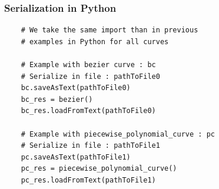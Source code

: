 \documentclass{article}
\begin{document}
    \subsubsection{Serialization in Python}
    \begin{lstlisting}
    # We take the same import than in previous
    # examples in Python for all curves
    
    # Example with bezier curve : bc
    # Serialize in file : pathToFile0
    bc.saveAsText(pathToFile0)
    bc_res = bezier()
    bc_res.loadFromText(pathToFile0)
    
    # Example with piecewise_polynomial_curve : pc
    # Serialize in file : pathToFile1
    pc.saveAsText(pathToFile1)
    pc_res = piecewise_polynomial_curve()
    pc_res.loadFromText(pathToFile1)
    \end{lstlisting}
    
\end{document}
